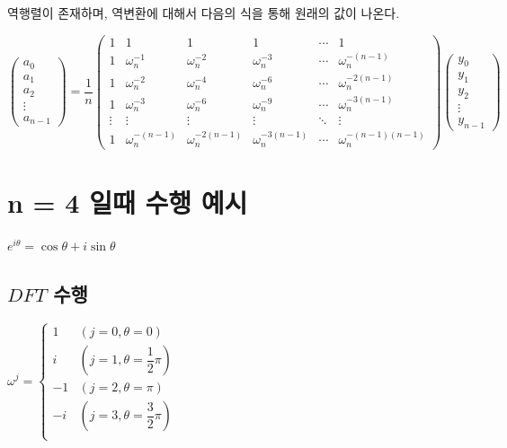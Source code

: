 \documentclass{oblivoir}
\begin{document}
역행렬이 존재하며, 역변환에 대해서 다음의 식을 통해 원래의 값이 나온다.

$
\begin{pmatrix}
    a_0 \\ 
    a_1 \\
    a_2 \\
    \vdots \\
    a_{n-1}
\end{pmatrix}
= \dfrac{1}{n}
\begin{pmatrix}
    1 & 1 & 1 & 1 & \cdots & 1 \\
    1 & \omega_n^{-1} & \omega_n^{-2} & \omega_n^{-3} & \cdots & \omega_n^{-(n-1)} \\
    1 & \omega_n^{-2} & \omega_n^{-4} & \omega_n^{-6} & \cdots & \omega_n^{-2(n-1)} \\
    1 & \omega_n^{-3} & \omega_n^{-6} & \omega_n^{-9} & \cdots & \omega_n^{-3(n-1)} \\
    \vdots & \vdots & \vdots & \vdots & \ddots & \vdots \\
    1 & \omega_n^{-(n-1)} & \omega_n^{-2(n-1)} & \omega_n^{-3(n-1)} & \cdots & \omega_n^{-(n-1)(n-1)} 
\end{pmatrix}
\begin{pmatrix}
    y_0 \\ 
    y_1 \\
    y_2 \\
    \vdots \\
    y_{n-1}
\end{pmatrix}
$

\section{n = 4 일때 수행 예시}

$e^{i\theta} = \cos \theta + i \sin \theta$



\subsection{$DFT$ 수행}

$
\omega^j = \left\{
\begin{array}{rl}
    1 & ( j = 0, \theta = 0 ) \\
    i & ( j = 1, \theta = \dfrac{1}{2}\pi) \\
    -1 & ( j = 2, \theta = \pi )\\
    -i & ( j = 3, \theta = \dfrac{3}{2}\pi) \\
\end{array}
\right.
$
\end{document}
